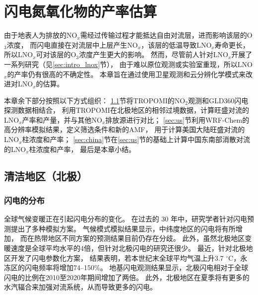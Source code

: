 
\chapter{闪电氮氧化物的产率估算} \label{chapter:PE}

由于地表人为排放的NO$_x$需经过传输过程才能抵达自由对流层，进而影响该层的O$_3$浓度，
而闪电直接在对流层中上层产生NO$_x$，该层的低温导致LNO$_x$寿命更长，
所以LNO$_x$可对该层的O$_3$浓度产生更大的影响。
然而，尽管前人针对LNO$_x$开展了一系列研究（见\ref{sec:intro_lnox}节），
由于难以原位观测或实验室重现，所以LNO$_x$的产率仍有很高的不确定性。
本章旨在通过使用卫星观测和云分辨化学模式来改进对LNO$_x$的估算。

本章余下部分按照以下方式组织：
\ref{sec:arctic}节将TROPOMI的NO$_2$观测和GLD360闪电探测数据相结合，
利用TROPOMI在北极地区的相邻过境数据，计算旺盛对流的LNO$_x$产率和产量，并与其他NO$_x$排放源进行对比；
\ref{sec:us}节利用WRF-Chem的高分辨率模拟结果，定义筛选条件和新的AMF，
用于计算美国大陆旺盛对流的LNO$_x$柱浓度和产率；
\ref{sec:china}节在\ref{sec:us}节的基础上计算中国东南部消散对流的LNO$_x$柱浓度和产率，
最后是本章小结。


\section{清洁地区（北极）} \label{sec:arctic}

\subsection{闪电的分布} \label{subsect:lightning_distribution}

全球气候变暖正在引起闪电分布的变化\citep{Reeve.1999,Williams.2005a,Price.2009a}。
在过去的 30 年中，研究学者针对闪电预测提出了多种模拟方案\citep{Price.1992,Price.1997b,Allen.2002,Futyan.2007,Finney.2014,Romps.2014}。
气候模式模拟结果显示，中纬度地区的闪电将有所增加\citep{Michalon.1999,Romps.2014,Luhar.2021}，
而在热带地区不同方案的预测结果目前仍存在分歧\citep{Finney.2018,Romps.2019}。
此外，虽然北极地区变暖速度是全球平均水平的4倍\citep{Rantanen.2022}，但针对北极闪电的研究还很少。
最近，\citet{Chen.2021a}针对北极地区开发了闪电参数化方案，
结果表明，若本世纪末全球平均气温上升3.7 $^{\circ}$C，永冻区的闪电频率将增加74--150\%。
地基闪电观测结果显示，北极闪电相对于全球闪电的比例在2010至2020年期间增加了两倍\citep{Holzworth.2021}。
此外，北极地区在夏季将有更多的水汽辐合来加强对流系统，从而导致更多的闪电\citep{Bintanja.2020}。

